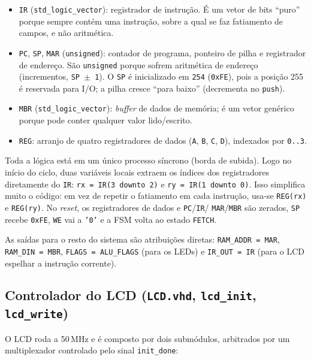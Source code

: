 \documentclass[12pt,a4paper]{article}
\begin{document}
\begin{itemize}
    \item \texttt{IR} (\texttt{std\_logic\_vector}): registrador de instrução. É um vetor
          de bits ``puro'' porque sempre contém uma instrução, sobre a qual se faz
          fatiamento de campos, e não aritmética.
    \item \texttt{PC}, \texttt{SP}, \texttt{MAR} (\texttt{unsigned}): contador de programa,
          ponteiro de pilha e registrador de endereço. São \texttt{unsigned} porque sofrem
          aritmética de endereço (incrementos, \texttt{SP $\pm$ 1}). O \texttt{SP} é
          inicializado em \texttt{254} (\texttt{0xFE}), pois a posição 255 é reservada para
          I/O; a pilha cresce ``para baixo'' (decrementa no \texttt{push}).
    \item \texttt{MBR} (\texttt{std\_logic\_vector}): \textit{buffer} de dados de memória;
          é um vetor genérico porque pode conter qualquer valor lido/escrito.
    \item \texttt{REG}: arranjo de quatro registradores de dados (\texttt{A}, \texttt{B},
          \texttt{C}, \texttt{D}), indexados por \texttt{0..3}.
\end{itemize}

Toda a lógica está em um único processo síncrono (borda de subida). Logo no início do ciclo,
duas variáveis locais extraem os índices dos registradores diretamente do \texttt{IR}:
\texttt{rx = IR(3\,downto\,2)} e \texttt{ry = IR(1\,downto\,0)}. Isso simplifica muito o
código: em vez de repetir o fatiamento em cada instrução, usa-se \texttt{REG(rx)} e
\texttt{REG(ry)}. No \textit{reset}, os registradores de dados e \texttt{PC}/\texttt{IR}/%
\texttt{MAR}/\texttt{MBR} são zerados, \texttt{SP} recebe \texttt{0xFE}, \texttt{WE} vai a
\texttt{'0'} e a FSM volta ao estado \texttt{FETCH}.

As saídas para o resto do sistema são atribuições diretas: \texttt{RAM\_ADDR = MAR},
\texttt{RAM\_DIN = MBR}, \texttt{FLAGS = ALU\_FLAGS} (para os LEDs) e \texttt{IR\_OUT = IR}
(para o LCD espelhar a instrução corrente).

\subsection{Controlador do LCD (\texttt{LCD.vhd}, \texttt{lcd\_init}, \texttt{lcd\_write})}

O LCD roda a 50\,MHz e é composto por dois submódulos, arbitrados por um multiplexador
controlado pelo sinal \texttt{init\_done}:
\end{document}
